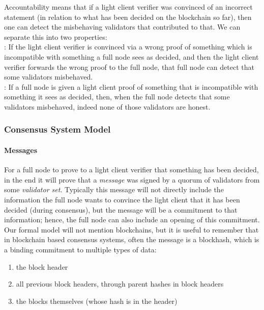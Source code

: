\noindent  Accountability means that if a light client verifier was convinced of an incorrect statement (in relation to what has been decided on the blockchain so far), 
then one can detect the misbehaving validators that contributed to that. We can separate this into two properties: \\%

: If the light client verifier is convinced via a wrong proof of something which is incompatible 
with something a full node sees as decided, and then the light client verifier forwards the wrong proof to the full node, that full node can detect that some validators misbehaved. \\

: If a full node is given a light client proof of something that is incompatible with something it sees as decided,
 then, when the full node detects that some validators misbehaved, indeed none of those validators are honest. \\
\vspace{-0.4cm}
\subsubsection{Consensus System Model}

\paragraph{Messages} For a full node to prove to a light client verifier that something has been decided, in the end it will prove that a {\it message} was signed by a quorum of validators from some {\it validator set}. 
Typically this message will not directly include the information the full node wants to convince the light client that it has been decided (during consensus), 
but the message will be a commitment to that information; hence, the full node can also include an opening of this commitment. \\
 
\noindent Our formal model will not mention blockchains, but it is useful to remember that in blockchain based consensus systems, often the message is a blockhash, which is a binding commitment to multiple types of data: 

\begin{enumerate}
\item the block header
\item all previous block headers, through parent hashes in block headers
\item the blocks themselves (whose hash is in the header)
\end{enumerate}

